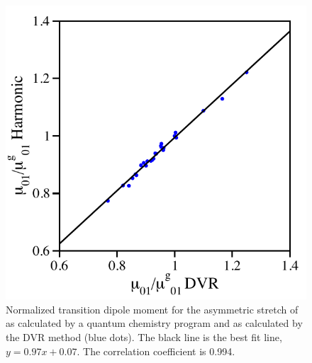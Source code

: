 \documentclass[]{article}
\begin{document}
\begin{figure}
  \centering
  \includegraphics{figureS1.pdf}
  \caption{Normalized transition dipole moment for the asymmetric stretch of  as calculated by a quantum chemistry program and as calculated by the DVR method (blue dots). The black line is the best fit line, \(y = 0.97x + 0.07\). The correlation coefficient is 0.994.}
  \label{paper_03:fig:S1}
\end{figure}
\end{document}
